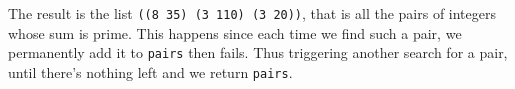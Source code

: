 \documentclass[a4paper,12pt]{article}
\begin{document}
The result is the list \lstinline!((8 35) (3 110) (3 20))!, that is
all the pairs of integers whose sum is prime.  This happens since each
time we find such a pair, we permanently add it to \lstinline!pairs!
then fails.  Thus triggering another search for a pair, until there's
nothing left and we return \lstinline!pairs!.
\end{document}
